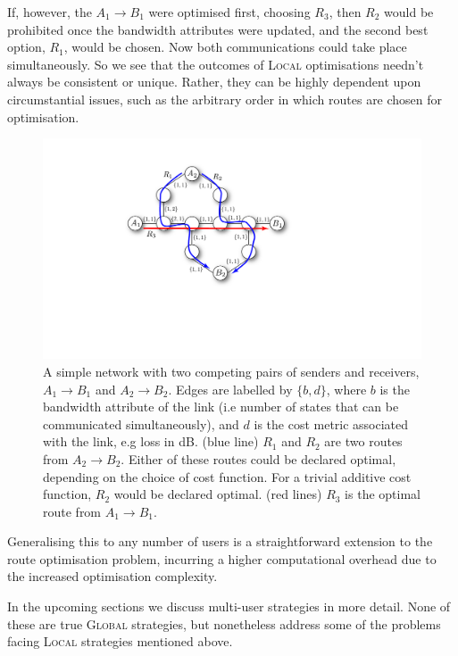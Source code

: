\documentclass[aps, rmp, twocolumn, amsmath, amssymb, nofootinbib, superscriptaddress, longbibliography, floatfix, table-of-contents, eqsecnum]{revtex4-1}
\begin{document}
If, however, the \mbox{$A_1\to B_1$} were optimised first, choosing $R_3$, then $R_2$ would be prohibited once the bandwidth attributes were updated, and the second best option, $R_1$, would be chosen. Now both communications could take place simultaneously. So we see that the outcomes of \textsc{Local} optimisations needn't always be consistent or unique. Rather, they can be highly dependent upon circumstantial issues, such as the arbitrary order in which routes are chosen for optimisation.

\begin{figure}[!htb]
\includegraphics[width=\columnwidth]{conflict}
\caption{A simple network with two competing pairs of senders and receivers, \mbox{$A_1\to B_1$} and \mbox{$A_2\to B_2$}. Edges are labelled by \mbox{$\{b,d\}$}, where $b$ is the bandwidth attribute of the link (i.e number of states that can be communicated simultaneously), and $d$ is the cost metric associated with the link, e.g loss in dB. (blue line) $R_1$ and $R_2$ are two routes from $A_2\to B_2$. Either of these routes could be declared optimal, depending on the choice of cost function. For a trivial additive cost function, $R_2$ would be declared optimal. (red lines) $R_3$ is the optimal route from \mbox{$A_1\to B_1$}.} \label{fig:conflict}
\end{figure}

Generalising this to any number of users is a straightforward extension to the route optimisation problem, incurring a higher computational overhead due to the increased optimisation complexity.

In the upcoming sections we discuss multi-user strategies in more detail. None of these are true \textsc{Global} strategies, but nonetheless address some of the problems facing \textsc{Local} strategies mentioned above.
\end{document}
